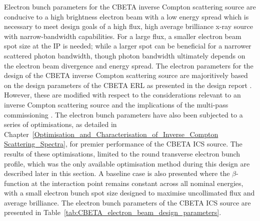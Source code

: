 \documentclass[../main.tex]{subfiles}
\begin{document}
Electron bunch parameters for the CBETA inverse Compton scattering source are conducive to a high brightness electron beam with a low energy spread which is necessary to meet design goals of a high flux, high average brilliance x-ray source with narrow-bandwidth capabilities. For a large flux, a smaller electron beam spot size at the IP is needed; while a larger spot can be beneficial for a narrower scattered photon bandwidth, though photon bandwidth ultimately depends on the electron beam divergence and energy spread. The electron parameters for the design of the CBETA inverse Compton scattering source are majoritively based on the design parameters of the CBETA ERL as presented in the design report \cite{hoffstaetter2017cbeta}. However, these are modified with respect to the considerations relevant to an inverse Compton scattering source and the implications of the multi-pass commissioning \cite{bartnik2020cbeta}. The electron bunch parameters have also been subjected to a series of optimisations, as detailed in Chapter~\ref{Optimisation_and_Characterisation_of_Inverse_Compton Scattering_Spectra}, for premier performance of the CBETA ICS source. The results of these optimisations, limited to the round transverse electron bunch profile, which was the only available optimisation method during this design are described later in this section. A baseline case is also presented where the $\beta$-function at the interaction point remains constant across all nominal energies, with a small electron bunch spot size designed to maximise uncollimated flux and average brilliance. The electron bunch parameters of the CBETA ICS source are presented in Table~\ref{tab:CBETA_electron_beam_design_parameters}.  
\end{document}
